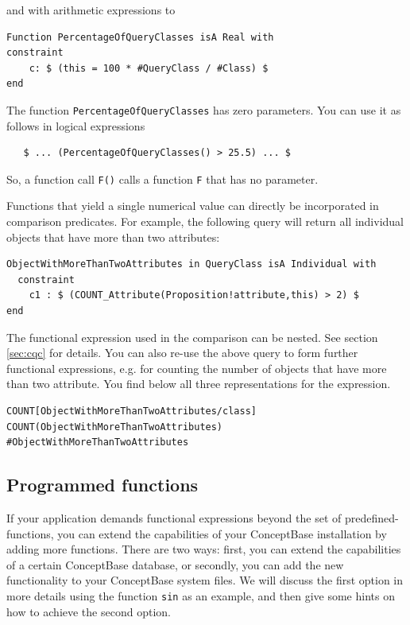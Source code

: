 \begin{enumerate}
and with arithmetic expressions to

{\small
\begin{verbatim}
Function PercentageOfQueryClasses isA Real with
constraint
    c: $ (this = 100 * #QueryClass / #Class) $ 
end
\end{verbatim}
}

The function {\tt PercentageOfQueryClasses} has zero parameters.
You can use it as follows in logical expressions

{\small
\begin{verbatim}
   $ ... (PercentageOfQueryClasses() > 25.5) ... $
\end{verbatim}
}

So, a function call {\tt F()} calls a function {\tt F} that has no parameter.

\end{enumerate}

Functions that yield a single numerical value can directly be incorporated in comparison
predicates. For example, the following query will return all individual objects that have more than
two attributes:

{\small
\begin{verbatim}
ObjectWithMoreThanTwoAttributes in QueryClass isA Individual with
  constraint
    c1 : $ (COUNT_Attribute(Proposition!attribute,this) > 2) $
end
\end{verbatim}
}

The functional expression used in the comparison can be nested. See section
\ref{sec:cqc} for details. You can also re-use the above query to form
further functional expressions, e.g. for counting the number of objects that
have more than two attribute. You find below all three representations for
the expression. 

{\small
\begin{verbatim}
COUNT[ObjectWithMoreThanTwoAttributes/class]
COUNT(ObjectWithMoreThanTwoAttributes)
#ObjectWithMoreThanTwoAttributes
\end{verbatim}
}


\subsection{Programmed functions}
\label{sec:UserFunctions}

If your application demands functional expressions beyond the set of predefined-functions,
you can extend the capabilities of your ConceptBase installation by adding more
functions. There are two ways: first, you can extend the capabilities of a certain
ConceptBase database,
or secondly, you can add the new functionality to your ConceptBase system files.
We will discuss the first option in more details using the function {\tt sin} as
an example, and then give some hints on how to achieve the
second option.

